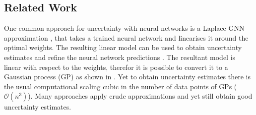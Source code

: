 \documentclass{article}
\begin{document}
%
%
%

\subsection{Related Work}
\label{sec:related}
%
One common approach for uncertainty with neural networks is a Laplace GNN approximation \citep{daxbergerLaplace2021}, that takes a trained neural network and linearises it around the optimal weights. The resulting linear model can be used to obtain uncertainty estimates and refine the neural network predictions \citep{immerScalable2021}. The resultant model is linear with respect to the weights, therefor it is possible to convert it to a Gaussian process (GP) as shown in \citep{immerScalable2021, khan2019approximate}. Yet to obtain uncertainty estimates there is the usual computational scaling  cubic in the number of data points of GPs ($\mathcal{O}(n^3)$). Many approaches  apply crude approximations and yet still obtain good uncertainty estimates. 
\end{document}

